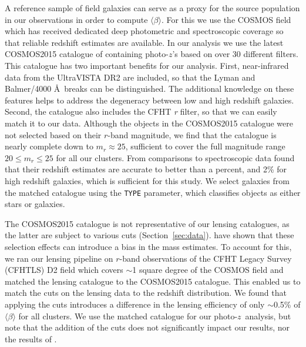 \documentclass[useAMS,usenatbib]{mnras}
\newcommand{\pz}{photo-$z$}
\begin{document}
A reference sample of field galaxies can serve as a proxy for the source population in our observations in order to compute $\langle \beta \rangle$. For this we use the COSMOS field which has received dedicated deep photometric and spectroscopic coverage so that reliable redshift estimates are available. In our analysis we use the latest COSMOS2015 catalogue of \citet{laigle16} containing \pz's based on over 30 different filters. This catalogue has two important benefits for our analysis. First, near-infrared data from the UltraVISTA DR2 are included, so that the Lyman and Balmer/4000 \AA \ breaks can be distinguished. The additional knowledge on these features helps to address the degeneracy between low and high redshift galaxies. Second, the catalogue also includes the CFHT \textit{r} filter, so that we can easily match it to our data. Although the objects in the COSMOS2015 catalogue were not selected based on their $r$-band magnitude, we find that the catalogue is nearly complete down to $m_r \approx 25$,  sufficient to cover the full magnitude range $20 \leq m_r \leq 25$ for all our clusters. From comparisons to spectroscopic data \citet{laigle16} found that their redshift estimates are accurate to better than a percent, and 2\% for high redshift galaxies, which is sufficient for this study. We select galaxies from the matched catalogue using the \texttt{TYPE} parameter, which classifies objects as either stars or galaxies. 

The COSMOS2015 catalogue is not representative of our lensing catalogues, as the latter are subject to various cuts (Section~\ref{sec:data}). \citet{gruen17} have shown that these selection effects can introduce a bias in the mass estimates. To account for this, we ran our lensing pipeline on $r$-band observations of the CFHT Legacy Survey (CFHTLS) D2 field which covers $\sim$1 square degree of the COSMOS field and matched the lensing catalogue to the COSMOS2015 catalogue. This enabled us to match the cuts on the lensing data to the redshift distribution.
We found that applying the cuts introduces a difference in the lensing efficiency of only $\sim$0.5\% of $\langle \beta \rangle$ for all clusters. We use the matched catalogue for our \pz \ analysis, but note that the addition of the cuts does not significantly impact our results, nor the results of .
\end{document}
